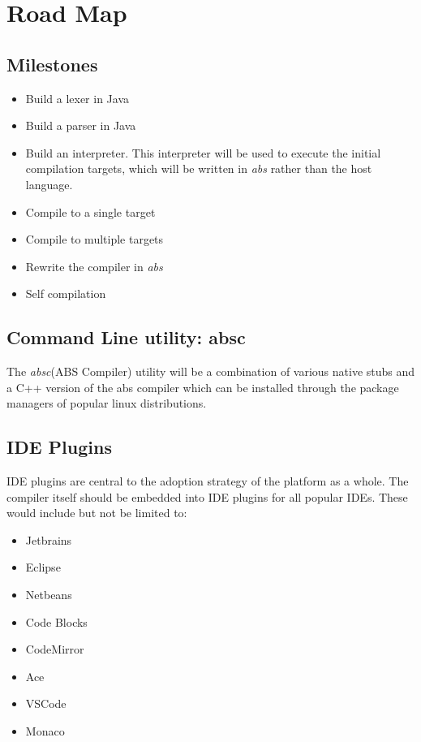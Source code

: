 \documentclass[hidelinks]{article}
\begin{document}
\section{Road Map}
\subsection{Milestones}
	\begin{itemize}
		\item Build a lexer in Java
		\item Build a parser in Java
		\item Build an interpreter. This interpreter will be used to execute the initial compilation targets, which will be written in \textit{abs} rather than the host language.
		\item Compile to a single target
		\item Compile to multiple targets
		\item Rewrite the compiler in \textit{abs}
		\item Self compilation
	\end{itemize}
\subsection{Command Line utility: absc}
The \textit{absc}(ABS Compiler) utility will be a combination of various native stubs and a C++ version of the abs compiler which can be installed through the package managers of popular linux distributions.
\subsection{IDE Plugins}
IDE plugins are central to the adoption strategy of the platform as a whole. The compiler itself should be embedded into IDE plugins for all popular IDEs. These would include but not be limited to:
	\begin{itemize}
		\item Jetbrains
		\item Eclipse
		\item Netbeans
		\item Code Blocks
		\item CodeMirror
		\item Ace
		\item VSCode
		\item Monaco
	\end{itemize}
\end{document}
